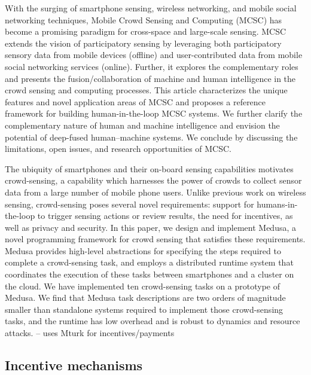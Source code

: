 \documentclass{sig-alternate}
\begin{document}
With the surging of smartphone sensing, wireless networking, and mobile social networking techniques, Mobile Crowd Sensing and Computing (MCSC) has become a promising paradigm for cross-space and large-scale sensing. MCSC extends the vision of participatory sensing by leveraging both participatory sensory data from mobile devices (offline) and user-contributed data from mobile social networking services (online). Further, it explores the complementary roles and presents the fusion/collaboration of machine and human intelligence in the crowd sensing and computing processes. This article characterizes the unique features and novel application areas of MCSC and proposes a reference framework for building human-in-the-loop MCSC systems. We further clarify the complementary nature of human and machine intelligence and envision the potential of deep-fused human--machine systems. We conclude by discussing the limitations, open issues, and research opportunities of MCSC. \cite{guo2015mobile}

The ubiquity of smartphones and their on-board sensing capabilities motivates crowd-sensing, a capability which harnesses the power of crowds to collect sensor data from a large number of mobile phone users. Unlike previous work on wireless sensing, crowd-sensing poses several novel requirements: support for humans-in-the-loop to trigger sensing actions or review results, the need for incentives, as well as privacy and security. In this paper, we design and implement Medusa, a novel programming framework for crowd sensing that satisfies these requirements. Medusa provides high-level abstractions for specifying the steps required to complete a crowd-sensing task, and employs a distributed runtime system that coordinates the execution of these tasks between smartphones and a cluster on the cloud. We have implemented ten crowd-sensing tasks on a prototype of Medusa. We find that Medusa task descriptions are two orders of magnitude smaller than standalone systems required to implement those crowd-sensing tasks, and the runtime has low overhead and is robust to dynamics and resource attacks. \cite{Ra12a} -- uses Mturk for incentives/payments

\subsection{Incentive mechanisms}
\end{document}
